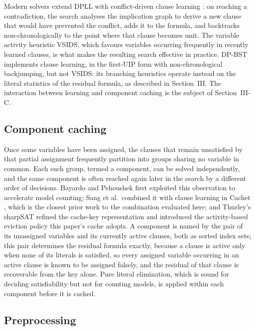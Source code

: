\documentclass[conference]{IEEEtran}
\begin{document}
Modern solvers extend DPLL with conflict-driven clause learning \cite{marques-silva1999}: on
reaching a contradiction, the search analyses the implication graph to derive a new clause that
would have prevented the conflict, adds it to the formula, and backtracks non-chronologically to
the point where that clause becomes unit. The variable activity heuristic VSIDS, which favours
variables occurring frequently in recently learned clauses, is what makes the resulting search
effective in practice. DP-BST implements clause learning, in the first-UIP form with
non-chronological backjumping, but not VSIDS: its branching heuristics operate instead on the
literal statistics of the residual formula, as described in Section~III. The interaction between
learning and component caching is the subject of Section~III-C.

\subsection{Component caching}

Once some variables have been assigned, the clauses that remain unsatisfied by that partial
assignment frequently partition into groups sharing no variable in common. Each such group,
termed a component, can be solved independently, and the same component is often reached again
later in the search by a different order of decisions. Bayardo and Pehoushek
\cite{bayardo2000} first exploited this observation to accelerate model counting; Sang et
al.\ combined it with clause learning in Cachet \cite{sang2004}, which is the closest prior work
to the combination evaluated here; and Thurley's sharpSAT
\cite{thurley2006} refined the cache-key representation and introduced the activity-based
eviction policy this paper's cache adopts. A component is named by the pair of its unassigned
variables and its currently active clauses, both as sorted index sets; this pair determines the
residual formula exactly, because a clause is active only when none of its literals is satisfied,
so every assigned variable occurring in an active clause is known to be assigned falsely, and the
residual of that clause is recoverable from the key alone. Pure literal elimination, which is
sound for deciding satisfiability but not for counting models, is applied within each component
before it is cached.

\subsection{Preprocessing}
\end{document}
